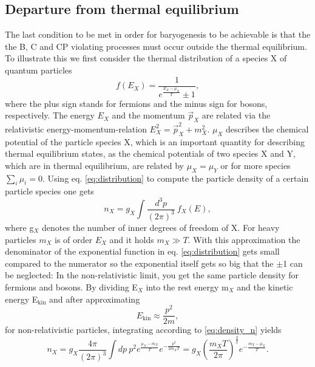 \subsection{Departure from thermal equilibrium}
The last condition to be met in order for baryogenesis to be achievable is that the the B, C and CP violating processes must occur outside the thermal equilibrium. To illustrate this we first consider the thermal distribution of a species X of quantum particles
\begin{equation}
	f(E_X)=\frac{1}{e^{\frac{E_X-\mu_X}{T}}\pm1},
	\label{eq:distribution}
\end{equation}
where the plus sign stands for fermions and the minus sign for bosons, respectively.
The energy $E_X$ and the momentum $\vec{p}_X$ are related via the relativistic energy-momentum-relation $E_X^2=\vec{p}_X^2+m_X^2$. $\mu_X$ describes the chemical potential of the particle species X, which is an important quantity for describing thermal equilibrium states, as the chemical potentials of two species X and Y, which are in thermal equilibrium, are related by $\mu_X=\mu_Y$ or for more species $\sum_i\mu_i=0$.\newline\indent
Using eq. \eqref{eq:distribution} to compute the particle density of a certain particle species one gets 
\begin{equation}
	n_X=g_X\int\frac{d^3p}{(2\pi)^3}\:f_X(E),
	\label{eq:density_n}
\end{equation}
where g$_X$ denotes the number of inner degrees of freedom of X. \newline\indent
For heavy particles $m_X$ is of order $E_X$ and it holds $m_X\gg T$. With this approximation the denominator of the exponential function in eq. \eqref{eq:distribution} gets small compared to the numerator so the exponential itself gets so big that the $\pm$1 can be neglected: In the non-relativistic limit, you get the same particle density for fermions and bosons. By dividing E$_X$ into the rest energy m$_X$ and the kinetic energy E$_{\text{kin}}$ and after approximating
\begin{equation}
	E_{\text{kin}}\approx\frac{p^2}{2m},
\end{equation}
for non-relativistic particles, integrating according to \eqref{eq:density_n} yields
\begin{equation}
n_X=g_X\frac{4\pi}{(2\pi)^3}\int dp\:p^2e^\frac{\mu_X-m_X}{T}e^{-\frac{p^2}{2m_XT}}=g_X\left(\frac{m_XT}{2\pi}\right)^\frac{3}{2}e^{-\frac{m_X-\mu_X}{T}}.
\label{eq:numerX}
\end{equation}
